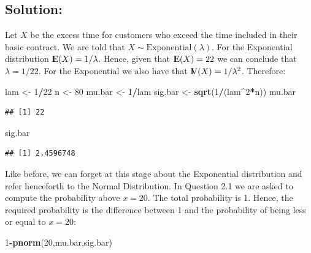 \documentclass[]{krantz}
\makeatletter
\newenvironment{Shaded}{\begin{snugshade}}{\end{snugshade}}
\newcommand{\KeywordTok}[1]{\textcolor[rgb]{0.13,0.29,0.53}{\textbf{#1}}}
\newcommand{\DecValTok}[1]{\textcolor[rgb]{0.00,0.00,0.81}{#1}}
\newcommand{\StringTok}[1]{\textcolor[rgb]{0.31,0.60,0.02}{#1}}
\newcommand{\OperatorTok}[1]{\textcolor[rgb]{0.81,0.36,0.00}{\textbf{#1}}}
\newcommand{\NormalTok}[1]{#1}
\newcommand{\Expec}{{\rm I\kern-.3em E}}
\newcommand{\Var}{{\rm I\kern-.3em V}}
\newenvironment{kframe}{%
\medskip{}
\setlength{\fboxsep}{.8em}
 \def\at@end@of@kframe{}%
 \ifinner\ifhmode%
  \def\at@end@of@kframe{\end{minipage}}%
  \begin{minipage}{\columnwidth}%
 \fi\fi%
 \def\FrameCommand##1{\hskip\@totalleftmargin \hskip-\fboxsep
 \colorbox{shadecolor}{##1}\hskip-\fboxsep
     \hskip-\linewidth \hskip-\@totalleftmargin \hskip\columnwidth}%
 \MakeFramed {\advance\hsize-\width
   \@totalleftmargin\z@ \linewidth\hsize
   \@setminipage}}%
 {\par\unskip\endMakeFramed%
 \at@end@of@kframe}
\renewenvironment{Shaded}{\begin{kframe}}{\end{kframe}}
\theoremstyle{definition}
\theoremstyle{definition}
\theoremstyle{definition}
\theoremstyle{remark}
\makeatother
\begin{document}
\subsection*{Solution:}\label{solution-2}


Let \(X\) be the excess time for customers who exceed the time included
in their basic contract. We are told that
\(X \sim \mathrm{Exponential}(\lambda)\). For the Exponential
distribution \(\Expec(X) = 1/\lambda\). Hence, given that
\(\Expec(X) = 22\) we can conclude that \(\lambda = 1/22\). For the
Exponential we also have that \(\Var(X) = 1/\lambda^2\). Therefore:

\begin{Shaded}
\begin{Highlighting}[]
\NormalTok{lam <-}\StringTok{ }\DecValTok{1}\OperatorTok{/}\DecValTok{22}
\NormalTok{n <-}\StringTok{ }\DecValTok{80}
\NormalTok{mu.bar <-}\StringTok{ }\DecValTok{1}\OperatorTok{/}\NormalTok{lam}
\NormalTok{sig.bar <-}\StringTok{ }\KeywordTok{sqrt}\NormalTok{(}\DecValTok{1}\OperatorTok{/}\NormalTok{(lam}\OperatorTok{^}\DecValTok{2}\OperatorTok{*}\NormalTok{n))}
\NormalTok{mu.bar}
\end{Highlighting}
\end{Shaded}

\begin{verbatim}
## [1] 22
\end{verbatim}

\begin{Shaded}
\begin{Highlighting}[]
\NormalTok{sig.bar}
\end{Highlighting}
\end{Shaded}

\begin{verbatim}
## [1] 2.4596748
\end{verbatim}

Like before, we can forget at this stage about the Exponential
distribution and refer henceforth to the Normal Distribution. In
Question 2.1 we are asked to compute the probability above \(x=20\). The
total probability is 1. Hence, the required probability is the
difference between 1 and the probability of being less or equal to
\(x=20\):

\begin{Shaded}
\begin{Highlighting}[]
\DecValTok{1}\OperatorTok{-}\KeywordTok{pnorm}\NormalTok{(}\DecValTok{20}\NormalTok{,mu.bar,sig.bar)}
\end{Highlighting}
\end{Shaded}
\end{document}
